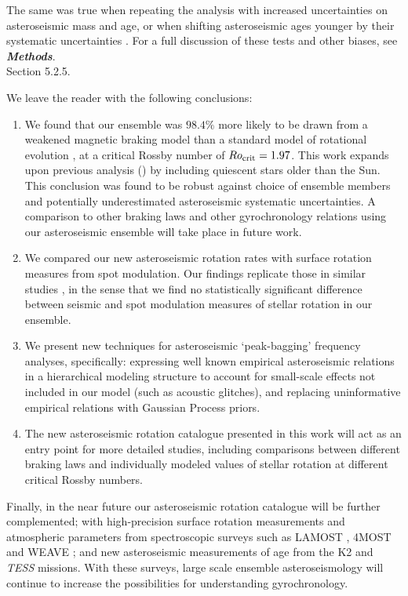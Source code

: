 \documentclass[12pt]{article}
\newcommand{\tess}{\emph{TESS}\xspace}
\newcommand{\ktwo}{K2\xspace}
\begin{document}
The same was true when repeating the analysis with increased uncertainties on asteroseismic mass and age, or when shifting asteroseismic ages younger by their systematic uncertainties \cite{silvaaguirre+2015, silvaaguirre+2017}.  For a full discussion of these tests and other biases, see \textbf{\textit{Methods}}.\\

Section 5.2.5.

We leave the reader with the following conclusions:
\begin{enumerate}
	\item We found that our ensemble was $98.4\%$ more likely to be drawn from a weakened magnetic braking model than a standard model of rotational evolution \cite{vansaders+pinsonneault2013}, at a critical Rossby number of $Ro_{\rm{crit}} = 1.97$. This work expands upon previous analysis (\cite{vansaders+2019}) by including quiescent stars older than the Sun. This conclusion was found to be robust against choice of ensemble members and potentially underestimated asteroseismic systematic uncertainties. A comparison to other braking laws \cite{matt+2015} and other gyrochronology relations using our asteroseismic ensemble will take place in future work.
	
	\item We compared our new asteroseismic rotation rates with surface rotation measures from spot modulation. Our findings replicate those in similar studies \cite{nielsen+2015,benomar+2015}, in the sense that we find no statistically significant difference between seismic and spot modulation measures of stellar rotation in our ensemble.
	
	\item We present new techniques for asteroseismic `peak-bagging' frequency analyses, specifically: expressing well known empirical asteroseismic relations in a hierarchical modeling structure to account for small-scale effects not included in our model (such as acoustic glitches), and replacing uninformative empirical relations with Gaussian Process priors.
	
	\item The new asteroseismic rotation catalogue presented in this work will act as an entry point for more detailed studies, including comparisons between different braking laws and individually modeled values of stellar rotation at different critical Rossby numbers.
\end{enumerate}

Finally, in the near future our asteroseismic rotation catalogue will be further complemented; with high-precision surface rotation measurements and atmospheric parameters from spectroscopic surveys such as LAMOST \cite{deng+2012}, 4MOST \cite{dejong+2014} and WEAVE \cite{dalton+2014}; and new asteroseismic measurements of age from the \ktwo and \tess missions. With these surveys, large scale ensemble asteroseismology will continue to increase the possibilities for understanding gyrochronology.\\
\end{document}
